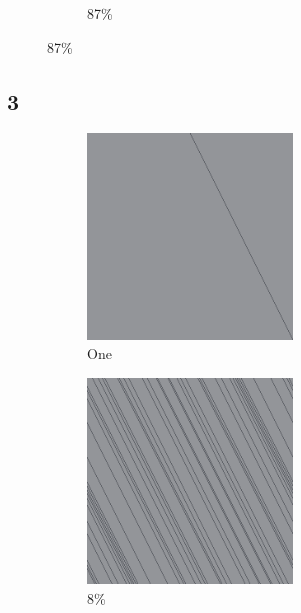 \documentclass[12pt, fleqn]{report}                             %
\theoremstyle{break}                                            %
\begin{document}
\begin{figure}[ht!]
\begin{subfigure}[b]{0.4\linewidth}
          \caption{87\%}
        \end{subfigure}
      \end{figure}


      \clearpage
      \subsection{3}
      \begin{figure}[ht!]
        \centering
        \begin{subfigure}[b]{0.4\linewidth}
          \includegraphics[width=0.6\textwidth]{Images/3/a.png}
          \caption{One}
        \end{subfigure}
        \begin{subfigure}[b]{0.4\linewidth}
          \includegraphics[width=0.6\textwidth]{Images/3/b.png}
          \caption{8\%}
        \end{subfigure}
        \begin{subfigure}[b]{0.4\linewidth}

\end{subfigure}
\end{figure}
\end{document}
